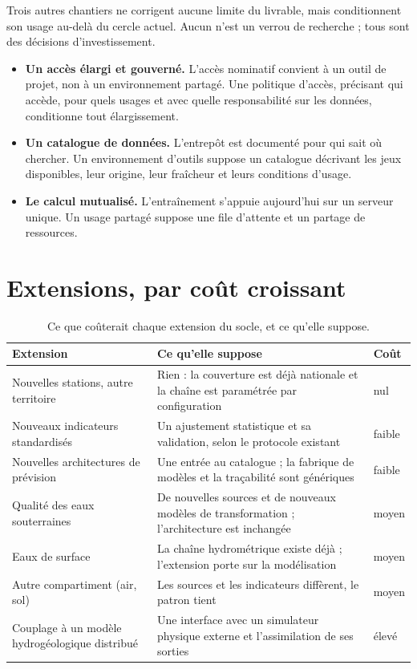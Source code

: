 Trois autres chantiers ne corrigent aucune limite du livrable, mais conditionnent son usage
au-delà du cercle actuel. Aucun n'est un verrou de recherche ; tous sont des décisions
d'investissement.

\begin{itemize}
  \item \textbf{Un accès élargi et gouverné.} L'accès nominatif convient à un outil de projet,
  non à un environnement partagé. Une politique d'accès, précisant qui accède, pour quels usages
  et avec quelle responsabilité sur les données, conditionne tout élargissement.

  \item \textbf{Un catalogue de données.} L'entrepôt est documenté pour qui sait où chercher.
  Un environnement d'outils suppose un catalogue décrivant les jeux disponibles, leur origine,
  leur fraîcheur et leurs conditions d'usage.

  \item \textbf{Le calcul mutualisé.} L'entraînement s'appuie aujourd'hui sur un serveur unique.
  Un usage partagé suppose une file d'attente et un partage de ressources.
\end{itemize}

\section{Extensions, par coût croissant}

\begin{table}[H]
\centering
\caption{Ce que coûterait chaque extension du socle, et ce qu'elle suppose.}
\label{tab:extensions}
\begin{tabularx}{\textwidth}{@{}lXl@{}}
\toprule
\textbf{Extension} & \textbf{Ce qu'elle suppose} & \textbf{Coût} \\
\midrule
Nouvelles stations, autre territoire & Rien : la couverture est déjà nationale et la chaîne est
paramétrée par configuration & nul \\
Nouveaux indicateurs standardisés & Un ajustement statistique et sa validation, selon le
protocole existant & faible \\
Nouvelles architectures de prévision & Une entrée au catalogue ; la fabrique de modèles et la
traçabilité sont génériques & faible \\
Qualité des eaux souterraines & De nouvelles sources et de nouveaux modèles de transformation ;
l'architecture est inchangée & moyen \\
Eaux de surface & La chaîne hydrométrique existe déjà ; l'extension porte sur la modélisation &
moyen \\
Autre compartiment (air, sol) & Les sources et les indicateurs diffèrent, le patron tient &
moyen \\
Couplage à un modèle hydrogéologique distribué & Une interface avec un simulateur physique
externe et l'assimilation de ses sorties & élevé \\
\bottomrule
\end{tabularx}
\end{table}

